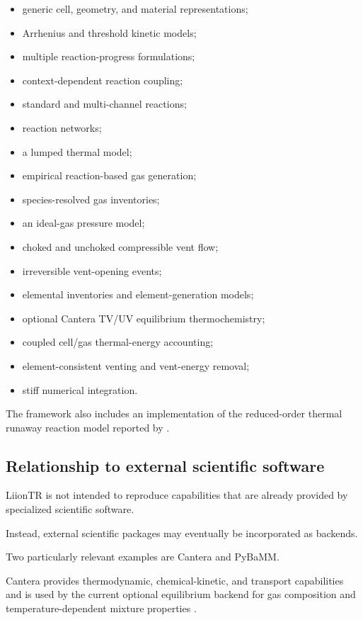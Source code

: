 \begin{itemize}
    \item generic cell, geometry, and material representations;
    \item Arrhenius and threshold kinetic models;
    \item multiple reaction-progress formulations;
    \item context-dependent reaction coupling;
    \item standard and multi-channel reactions;
    \item reaction networks;
    \item a lumped thermal model;
    \item empirical reaction-based gas generation;
    \item species-resolved gas inventories;
    \item an ideal-gas pressure model;
    \item choked and unchoked compressible vent flow;
    \item irreversible vent-opening events;
    \item elemental inventories and element-generation models;
    \item optional Cantera TV/UV equilibrium thermochemistry;
    \item coupled cell/gas thermal-energy accounting;
    \item element-consistent venting and vent-energy removal;
    \item stiff numerical integration.
\end{itemize}

The framework also includes an implementation of the reduced-order
thermal runaway reaction model reported by
\textcite{hu2020inhibition}.


\subsection{Relationship to external scientific software}

LiionTR is not intended to reproduce capabilities that are already
provided by specialized scientific software.

Instead, external scientific packages may eventually be incorporated as
backends.

Two particularly relevant examples are Cantera and PyBaMM.

Cantera provides thermodynamic, chemical-kinetic, and transport
capabilities and is used by the current optional equilibrium backend for
gas composition and temperature-dependent mixture properties
\parencite{cantera2025}.

